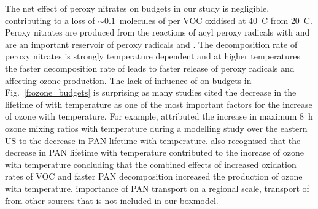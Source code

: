 \vspace{-5mm}
The net effect of peroxy nitrates on  budgets in our study is negligible, contributing to a loss of $\sim0.1$~molecules of  per VOC oxidised at $40$~\degree C from $20$~\degree C.
Peroxy nitrates are produced from the reactions of acyl peroxy radicals with  and are an important reservoir of peroxy radicals and .
The decomposition rate of peroxy nitrates is strongly temperature dependent and at higher temperatures the faster decomposition rate of  leads to faster release of peroxy radicals and  affecting ozone production.
The lack of influence of  on  budgets in Fig.~\ref{f:ozone_budgets} is surprising as many studies cited the decrease in the lifetime of  with temperature as one of the most important factors for the increase of ozone with temperature.
For example, \citet{Dawson:2007} attributed the increase in maximum 8~h ozone mixing ratios with temperature during a modelling study over the eastern US to the decrease in PAN lifetime with temperature.
\citet{Steiner:2006} also recognised that the decrease in PAN lifetime with temperature contributed to the increase of ozone with temperature concluding that the combined effects of increased oxidation rates of VOC and faster PAN decomposition increased the production of ozone with temperature.
\citet{Moxim:1996} importance of PAN transport on a regional scale, transport of  from other sources that is not included in our boxmodel.

